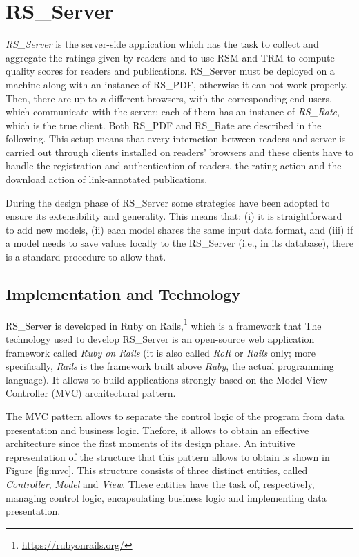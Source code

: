 \documentclass[a4paper, english]{article}
\begin{document}
\section{RS\_Server}

\emph{RS\_Server} is the server-side application which has the task to collect and aggregate the ratings given by readers and to use RSM and TRM to compute quality scores for readers and publications. RS\_Server must be deployed on a machine along with an instance of RS\_PDF, otherwise it can not work properly.
Then, there are up to \emph{n} different browsers, with the corresponding end-users, which communicate with the server: each of them has an instance of \emph{RS\_Rate}, which is the true client. 
Both RS\_PDF and RS\_Rate are described in the following. 
This setup means that every interaction between readers and server is carried out through clients installed on readers' browsers and these clients have to handle the registration and authentication of readers, the rating action and the download action of link-annotated publications.

During the design phase of RS\_Server some strategies have been adopted to ensure its extensibility and generality. This means that: (i) it is straightforward to add new models, (ii) each model shares the same input data format, and (iii) if a model needs to save values locally to the RS\_Server (i.e., in its database), there is a standard procedure to allow that.

\subsection{Implementation and Technology}

RS\_Server is developed in Ruby on Rails,\footnote{\url{https://rubyonrails.org/}} which is a framework that
The technology used to develop RS\_Server is an open-source web application framework called \emph{Ruby on Rails} (it is also called \emph{RoR} or \emph{Rails} only; more specifically, \emph{Rails} is the framework built above \emph{Ruby}, the actual programming language). It allows to build applications strongly based on the Model-View-Controller (MVC) architectural pattern.

The MVC pattern allows to separate the control logic of the program from data  presentation and business logic. Thefore, it allows to obtain an effective architecture since the first moments of its design phase. An intuitive representation of the structure that this pattern allows to obtain is shown in Figure \ref{fig:mvc}. This structure consists of three distinct entities, called \emph{Controller}, \emph{Model} and \emph{View}. These entities have the task of, respectively, managing control logic, encapsulating business logic and implementing data presentation.
\end{document}
